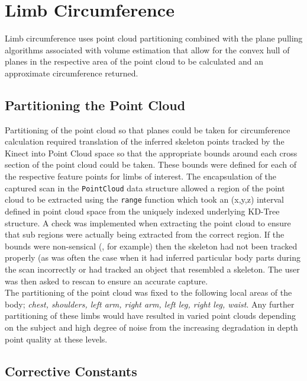 \section{Limb Circumference}

Limb circumference uses point cloud partitioning combined with the plane pulling algorithms associated with volume estimation that allow for the convex hull of planes in the respective area of the point cloud to be calculated and an approximate circumference returned.

\subsection{Partitioning the Point Cloud}

Partitioning of the point cloud so that planes could be taken for circumference calculation required translation of the inferred skeleton points tracked by the Kinect into Point Cloud space so that the appropriate bounds around each cross section of the point cloud could be taken. These bounds were defined for each of the respective feature points for limbs of interest. The encapsulation of the captured scan in the \texttt{PointCloud} data structure allowed a region of the point cloud to be extracted using the \texttt{range} function which took an (x,y,z) interval defined in point cloud space from the uniquely indexed underlying KD-Tree structure. A check was implemented when extracting the point cloud to ensure that sub regions were actually being extracted from the correct region. If the bounds were non-sensical (, for example) then the skeleton had not been tracked properly (as was often the case when it had inferred particular body parts during the scan incorrectly or had tracked an object that resembled a skeleton. The user was then asked to rescan to ensure an accurate capture. \\

The partitioning of the point cloud was fixed to the following local areas of the body; \emph{chest, shoulders, left arm, right arm, left leg, right leg, waist}. Any further partitioning of these limbs would have resulted in varied point clouds depending on the subject and high degree of noise from the increasing degradation in depth point quality at these levels.\\

\subsection{Corrective Constants}

